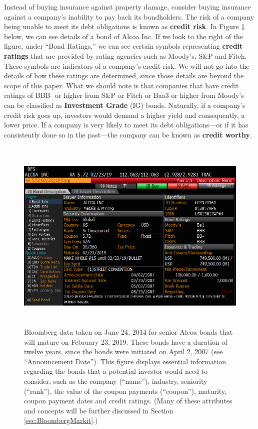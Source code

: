 \documentclass{jss}
\begin{document}
Instead of buying insurance against property damage, consider buying insurance against a company's inability to pay back its bondholders. The risk of a company being unable to meet its debt obligations is known as \textbf{credit risk}. In Figure \ref{fig:AlcoaBond} below, we can see details of a bond of Alcoa Inc. If we look to the right of the figure, under ``Bond Ratings,'' we can see certain symbols representing \textbf{credit ratings} that are provided by rating agencies such as Moody's, S\&P and Fitch. These symbols are indicators of a company's credit risk. We will not go into the details of how these ratings are determined, since those details are beyond the scope of this paper. What we should note is that companies that have credit ratings of BBB- or higher from S\&P or Fitch or Baa3 or higher from Moody's can be classified as \textbf{Investment Grade} (IG) bonds. Naturally, if a company's credit risk goes up, investors would demand a higher yield and consequently, a lower price. If a company is very likely to meet its debt obligations---or if it has consistently done so in the past---the company can be known as \textbf{credit worthy}.

\begin{figure}[H]
\centering
\includegraphics[width=5in, height=3.7in]{images/AlcoaBond.png}
\caption{Bloomberg data taken on June 24, 2014 for senior Alcoa bonds that will mature on February 23, 2019. These bonds have a duration of twelve years, since the bonds were initiated on April 2, 2007 (see ``Announcement Date''). This figure displays essential information regarding the bonds that a potential investor would need to consider, such as the company (``name''), industry, seniority (``rank''), the value of the coupon payments (``coupon''), maturity, coupon payment dates and credit ratings. (Many of these attributes and concepts will be further discussed in Section \ref{sec:BloombergMarkit}.)}
\label{fig:AlcoaBond}
\end{figure}
\end{document}
